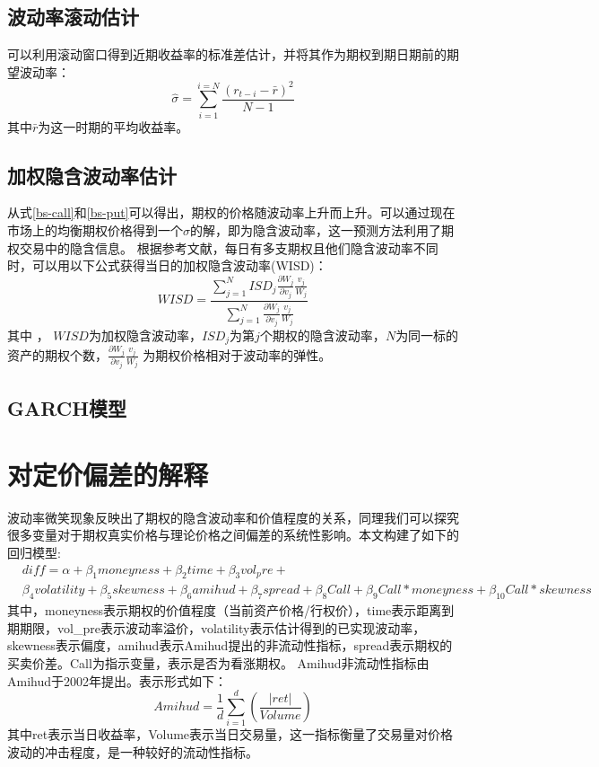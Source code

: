     \subsection{波动率滚动估计}
    可以利用滚动窗口得到近期收益率的标准差估计，并将其作为期权到期日期前的期望波动率：
    \begin{equation}\label{volatility-rolling}
        \hat{\sigma}=\sum_{i=1}^{i=N}\frac{(r_{t-i}-\bar{r})^2}{N-1}
    \end{equation}
    其中$\bar{r}$为这一时期的平均收益率。
    \subsection{加权隐含波动率估计}
    从式\ref{bs-call}和\ref{bs-put}可以得出，期权的价格随波动率上升而上升。可以通过现在市场上的均衡期权价格得到一个$\sigma$的解，即为隐含波动率，这一预测方法利用了期权交易中的隐含信息。
    根据参考文献\cite{CHIRAS1978213}，每日有多支期权且他们隐含波动率不同时，可以用以下公式获得当日的加权隐含波动率(WISD)：
    \begin{equation}
        WISD=\frac{\sum_{j=1}^{N}{ISD_j\frac{\partial{W_j}}{\partial{v_j}}\frac{v_j}{W_j}}}{\sum_{j=1}^{N}{\frac{\partial{W_j}}{\partial{v_j}}\frac{v_j}{W_j}}}
    \end{equation}
    其中 ， $WISD$为加权隐含波动率，$ISD_j$为第$j$个期权的隐含波动率，$N$为同一标的资产的期权个数，$\frac{\partial{W_j}}{\partial{v_j}}\frac{v_j}{W_j}$ 为期权价格相对于波动率的弹性。
    \subsection{GARCH模型}

    \section{对定价偏差的解释}
    波动率微笑现象反映出了期权的隐含波动率和价值程度的关系，同理我们可以探究很多变量对于期权真实价格与理论价格之间偏差的系统性影响。本文构建了如下的回归模型:
    \begin{equation}
        \begin{split}
        &diff=\alpha+\beta_1{moneyness}+\beta_2{time}+\beta_3{vol_pre}+\\
        &\beta_4{volatility}+\beta_5{skewness}+\beta_6{amihud}+\beta_7{spread}+\beta_8{Call}+\beta_9{Call*moneyness}+\beta_10{Call*skewness}
        \end{split}
    \end{equation}
    其中，moneyness表示期权的价值程度（当前资产价格/行权价），time表示距离到期期限，vol\_pre表示波动率溢价，volatility表示估计得到的已实现波动率，skewness表示偏度，amihud表示Amihud提出的非流动性指标，spread表示期权的买卖价差。Call为指示变量，表示是否为看涨期权。
    Amihud非流动性指标由Amihud于2002年提出\cite{Yako-2002}。表示形式如下：
    \begin{equation}
        Amihud=\frac{1}{d}\sum_{i=1}^{d}{(\frac{|ret|}{Volume})}
    \end{equation}
    其中ret表示当日收益率，Volume表示当日交易量，这一指标衡量了交易量对价格波动的冲击程度，是一种较好的流动性指标。
